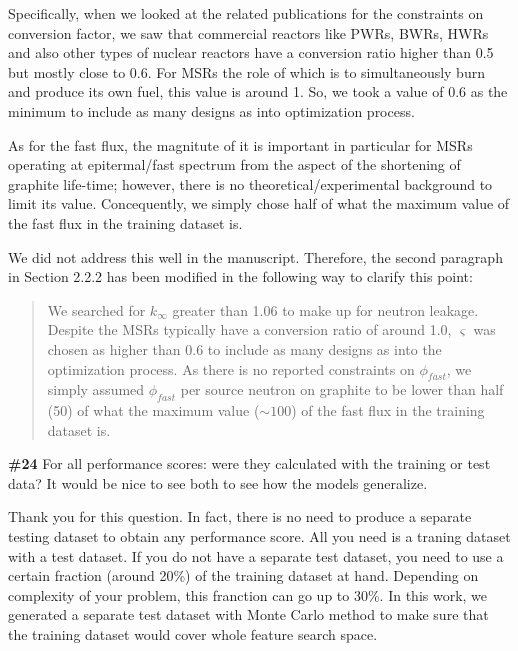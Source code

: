 \documentclass{ar2rc}
\begin{document}
    Specifically, when we looked at the related publications for the constraints on conversion factor, we saw that commercial reactors like PWRs, BWRs, HWRs and also other types of nuclear reactors have a conversion ratio higher than 0.5 but mostly close to 0.6. For MSRs the role of which is to simultaneously burn and produce its own fuel, this value is around 1. So, we took a value of 0.6 as the minimum to include as many designs as into optimization process.

    As for the fast flux, the magnitute of it is important in particular for MSRs operating at epitermal/fast spectrum from the aspect of the shortening of graphite life-time; however, there is no theoretical/experimental background to limit its value. Concequently, we simply chose half of what the maximum value of the fast flux in the training dataset is.

    We did not address this well in the manuscript. Therefore, the second paragraph in Section 2.2.2 has been modified in the following way to clarify this point:\\

    \begin{quote}
        We searched for $k_{\infty}$ greater than 1.06 to make up for neutron leakage. Despite the MSRs typically have a conversion ratio of around 1.0, $\varsigma$ was chosen as higher than 0.6 to include as many designs as into the optimization process. As there is no reported constraints on $\phi_{fast}$, we simply assumed $\phi_{fast}$ per source neutron on graphite to be lower than half (50) of what the maximum value ($\sim100$) of the fast flux in the training dataset is.
    \end{quote}


    \Comment \textbf{\#24} For all performance scores: were they calculated with the training
    or test data? It would be nice to see both to see how the models generalize.

    \Response Thank you for this question. In fact, there is no need to produce a separate testing dataset to obtain any performance score. All you need is a traning dataset with a test dataset. If you do not have a separate test dataset, you need to use a certain fraction (around 20\%) of the training dataset at hand. Depending on complexity of your problem, this franction can go up to 30\%. In this work, we generated a separate test dataset with Monte Carlo method to make sure that the training dataset would cover whole feature search space.
\end{document}
